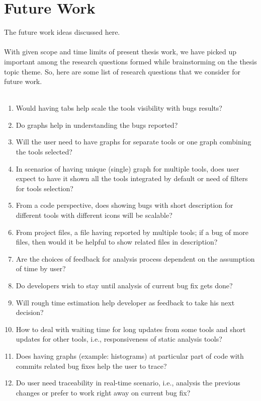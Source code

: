\chapter{Future Work}
\label{ch:futurework_report}

The future work ideas discussed here. \\ \\


With given scope and time limits of present thesis work, we have picked up important among the research questions formed while brainstorming on the thesis topic theme. So, here are some list of research questions that we consider for future work. \\ \\

\begin{enumerate}
\item Would having tabs help scale the tools visibility with bugs results?
\item Do graphs help in understanding the bugs reported?
\item Will the user need to have graphs for separate tools or one graph combining the tools selected?
\item In scenarios of having unique (single) graph for multiple tools, does user expect to have it shown all the tools integrated by default or need of filters for tools selection?
\item From a code perspective, does showing bugs with short description for different tools with different icons will be scalable?
\item From project files, a file having reported by multiple tools; if a bug of more files, then would it be helpful to show related files in description? 
\item Are the choices of feedback for analysis process dependent on the assumption of time by user?
\item Do developers wish to stay until analysis of current bug fix gets done?
\item Will rough time estimation help developer as feedback to take his next decision?
\item How to deal with waiting time for long updates from some tools and short updates for other tools, i.e., responsiveness of static analysis tools?
\item Does having graphs (example: histograms) at particular part of code with commits related bug fixes help the user to trace?
\item Do user need traceability in real-time scenario, i.e., analysis the previous changes or prefer to work right away on current bug fix?

\end{enumerate}
